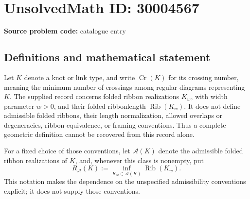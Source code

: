 \documentclass[11pt]{article}
\begin{document}
\section*{UnsolvedMath ID: 30004567}
\textbf{Source problem code:} catalogue entry
\subsection{Definitions and mathematical statement}
Let \(K\) denote a knot or link type, and write \(\operatorname{Cr}(K)\) for its crossing number, meaning the minimum number of crossings among regular diagrams representing \(K\). The supplied record concerns folded ribbon realizations \(K_w\), with width parameter \(w>0\), and their folded ribbonlength \(\operatorname{Rib}(K_w)\). It does not define admissible folded ribbons, their length normalization, allowed overlaps or degeneracies, ribbon equivalence, or framing conventions. Thus a complete geometric definition cannot be recovered from this record alone.

For a fixed choice of those conventions, let \(\mathcal A(K)\) denote the admissible folded ribbon realizations of \(K\), and, whenever this class is nonempty, put
\[
R_{\mathcal A}(K):=\inf_{K_w\in\mathcal A(K)}\operatorname{Rib}(K_w).
\]
This notation makes the dependence on the unspecified admissibility conventions explicit; it does not supply those conventions.
\end{document}
